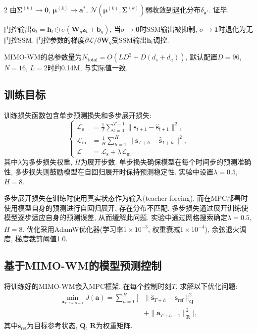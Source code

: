 \begin{multicols}{2}
由${\bm \Sigma}^{(k)} \to {\bm 0}$, ${\bm \mu}^{(k)} \to {\bm a}^*$,
$\mathcal{N}({\bm \mu}^{(k)}, {\bm \Sigma}^{(k)})$弱收敛到退化分布$\delta_{{\bm a}^*}$.
证毕.

\begin{Cor}
\label{cor:gate}
门控输出${\bm o}_t = {\bm h}_t \odot \sigma({\bm W}_g\tilde{{\bm z}}_t + {\bm b}_g)$,
当$\sigma \to {\bm 0}$时SSM输出被抑制, $\sigma \to {\bm 1}$时退化为无门控SSM.
门控参数的梯度$\partial \mathcal{L}/\partial {\bm W}_g$受SSM输出${\bm h}_t$调控.
\end{Cor}

MIMO-WM的总参数量为$N_{\text{total}} = O(LD^2 + D(d_s+d_a))$,
默认配置$D=96$, $N=16$, $L=2$时约0.14M, 与实际值一致.

\subsection{训练目标}

训练损失函数包含单步预测损失和多步展开损失:
\begin{equation}
\left\{\begin{aligned}
\mathcal{L}_{\text{s}} &= \frac{1}{T}\sum_{t=0}^{T-1}\|{\bm s}_{t+1} - \hat{{\bm s}}_{t+1}\|^2, \\
\mathcal{L}_{\text{m}} &= \frac{1}{H}\sum_{h=1}^{H}\|{\bm s}_{T+h} - \hat{{\bm s}}_{T+h}\|^2, \\
\mathcal{L} &= \mathcal{L}_{\text{s}} + \lambda \mathcal{L}_{\text{m}}.
\end{aligned}\right.
\end{equation}
其中$\lambda$为多步损失权重, $H$为展开步数.
单步损失确保模型在每个时间步的预测准确性,
多步损失则鼓励模型在自回归展开时保持预测稳定性.
实验中设置$\lambda=0.5$, $H=8$.

多步展开损失在训练时使用真实状态作为输入(teacher forcing),
而在MPC部署时使用模型自身的预测进行自回归展开, 存在分布不匹配.
多步损失通过展开训练使模型逐步适应自身的预测误差, 从而缓解此问题.
实验中通过网格搜索确定$\lambda{=}0.5$, $H{=}8$.
优化采用AdamW优化器\textsuperscript{\cite{27}}(学习率$1{\times}10^{-3}$, 权重衰减$1{\times}10^{-4}$),
余弦退火调度, 梯度裁剪阈值1.0.

\subsection{基于MIMO-WM的模型预测控制}

将训练好的MIMO-WM嵌入MPC框架. 在每个控制时刻$T$,
求解以下优化问题:
\begin{equation}
\label{eq:mpc}
\begin{aligned}
\min_{{\bm a}_{T:T+H-1}} J({\bm a}) = \sum_{h=1}^{H}\Big[ &\|\hat{{\bm s}}_{T+h} - {\bm s}_{\text{ref}}\|_{{\bm Q}}^2 \\
&+ \|{\bm a}_{T+h-1}\|_{{\bm R}}^2\Big],
\end{aligned}
\end{equation}
其中${\bm s}_{\text{ref}}$为目标参考状态, ${\bm Q}$, ${\bm R}$为权重矩阵.


\end{multicols}
